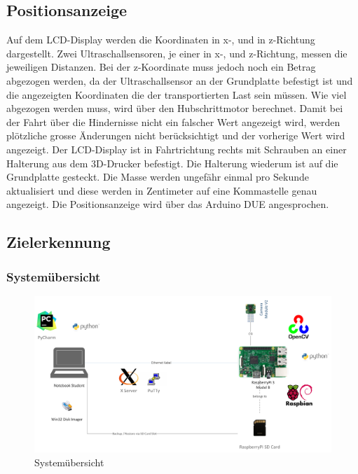 \documentclass[a4paper]{report}
\begin{document}
\subsection{Positionsanzeige}

Auf dem LCD-Display werden die Koordinaten in x-, und in z-Richtung dargestellt. Zwei Ultraschallsensoren, je einer in x-, und z-Richtung, messen die jeweiligen Distanzen. Bei der z-Koordinate muss jedoch noch ein Betrag abgezogen werden, da der Ultraschallsensor an der Grundplatte befestigt ist und die angezeigten Koordinaten die der transportierten Last sein müssen. Wie viel abgezogen werden muss, wird über den Hubschrittmotor berechnet. Damit bei der Fahrt über die Hindernisse nicht ein falscher Wert angezeigt wird, werden plötzliche grosse Änderungen nicht berücksichtigt und der vorherige Wert wird angezeigt. Der LCD-Display ist in Fahrtrichtung rechts mit Schrauben an einer Halterung aus dem 3D-Drucker befestigt. Die Halterung wiederum ist auf die Grundplatte gesteckt. Die Masse werden ungefähr einmal pro Sekunde aktualisiert und diese werden in Zentimeter auf eine Kommastelle genau angezeigt. Die Positionsanzeige wird über das Arduino DUE angesprochen. 

\subsection{Zielerkennung}
\subsubsection{Systemübersicht}

\begin{figure}[h!]
	\includegraphics[keepaspectratio,width=\textwidth]{TargetRecOS}
	\caption{Systemübersicht}
	\label{fig:Systemuebersicht}
\end{figure}
\end{document}
